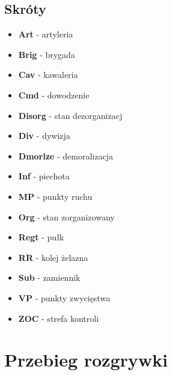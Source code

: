 \documentclass[10pt,twoside,a4paper,table]{article}
\begin{document}
\begin{multicols*}{2}
	\subsection{Skróty}
	\begin{itemize}
		\item[] \textbf{Art} - artyleria
		\item[] \textbf{Brig} - brygada
		\item[] \textbf{Cav} - kawaleria
		\item[] \textbf{Cmd} - dowodzenie
		\item[] \textbf{Disorg} - stan dezorganizacj
		\item[] \textbf{Div} - dywizja
		\item[] \textbf{Dmorlze} - demoralizacja
		\item[] \textbf{Inf} - piechota
		\item[] \textbf{MP} - punkty ruchu
		\item[] \textbf{Org} - stan zorganizowany
		\item[] \textbf{Regt} - pułk
		\item[] \textbf{RR} - kolej żelazna
		\item[] \textbf{Sub} - zamiennik
		\item[] \textbf{VP} - punkty zwycięstwa
		\item[] \textbf{ZOC} - strefa kontroli
	\end{itemize}
	\section{Przebieg rozgrywki}
\end{multicols*}
\end{document}
